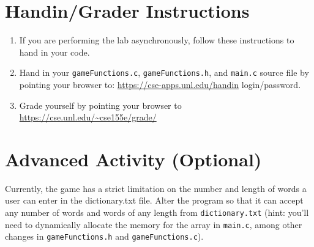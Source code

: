 \documentclass[12pt]{scrartcl}
\begin{document}
\section{Handin/Grader Instructions}

\begin{enumerate}
  \item If you are performing the lab asynchronously, follow these instructions to hand in your code.
  \item Hand in your \texttt{gameFunctions.c}, \texttt{gameFunctions.h}, and \texttt{main.c} source file by pointing your browser to:
  	\url{https://cse-apps.unl.edu/handin}
	login/password.
  \item Grade yourself by pointing your browser to
  	\url{https://cse.unl.edu/~cse155e/grade/}
\end{enumerate}

\section{Advanced Activity (Optional)}

Currently, the game has a strict limitation on the number and length of 
words a user can enter in the dictionary.txt file.  Alter the program so 
that it can accept any number of words and words of any length from 
\texttt{dictionary.txt} (hint: you'll need to dynamically allocate 
the memory for the array in \texttt{main.c}, among other 
changes in \texttt{gameFunctions.h} and \texttt{gameFunctions.c}).  
\end{document}
